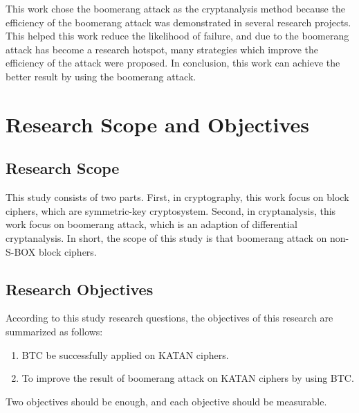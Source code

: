 This work chose the boomerang attack as the cryptanalysis method because the efficiency of the boomerang attack was demonstrated in several research projects. This helped this work reduce the likelihood of failure, and due to the boomerang attack has become a research hotspot, many strategies which improve the efficiency of the attack were proposed. In conclusion, this work can achieve the better result by using the boomerang attack.

\section{Research Scope and Objectives}
\subsection{Research Scope}
This study consists of two parts. First, in cryptography, this work focus on block ciphers, which are symmetric-key cryptosystem.  Second, in cryptanalysis, this work focus on boomerang attack, which is an adaption of differential cryptanalysis. In short, the scope of this study is that boomerang attack on non-S-BOX block ciphers.

\subsection{Research Objectives}
According to this study research questions, the objectives of this research are summarized as follows:
\begin{enumerate}[noitemsep]
\item BTC be successfully applied on KATAN ciphers.
\item To improve the result of boomerang attack on KATAN ciphers by using BTC.
\end{enumerate}
Two objectives should be enough, and each objective should be measurable.

